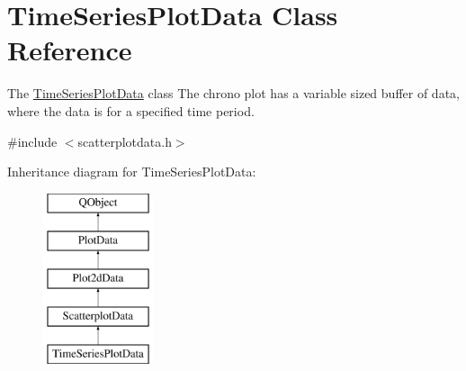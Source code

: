 \hypertarget{class_time_series_plot_data}{\section{Time\-Series\-Plot\-Data Class Reference}
\label{class_time_series_plot_data}
}


The \hyperlink{class_time_series_plot_data}{Time\-Series\-Plot\-Data} class The chrono plot has a variable sized buffer of data, where the data is for a specified time period.  




{\ttfamily \#include $<$scatterplotdata.\-h$>$}

Inheritance diagram for Time\-Series\-Plot\-Data\-:\begin{figure}[H]
\begin{center}
\leavevmode
\includegraphics[height=5.000000cm]{class_time_series_plot_data}
\end{center}
\end{figure}
